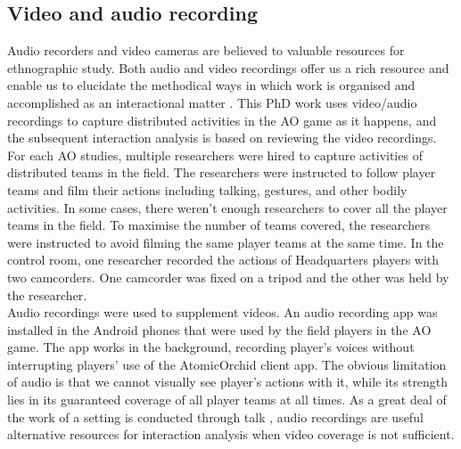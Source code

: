 \subsection{Video and audio recording}
Audio recorders and video cameras are believed to valuable resources for ethnographic study. Both audio and video recordings offer us a rich resource and enable us to elucidate the methodical ways in which work is organised and accomplished as an interactional matter \cite{Crabtree2012}. This PhD work uses video/audio recordings to capture distributed activities in the \acf{AO} game as it happens, and the subsequent interaction analysis is based on reviewing the video recordings. \\

For each \ac{AO} studies, multiple researchers were hired to capture activities of distributed teams in the field. The researchers were instructed to follow player teams and film their actions including talking, gestures, and other bodily activities. In some cases, there weren't enough researchers to cover all the player teams in the field. To maximise the number of teams covered, the researchers were instructed to avoid filming the same player teams at the same time. In the control room, one researcher recorded the actions of Headquarters players with two camcorders. One camcorder was fixed on a tripod and the other was held by the researcher. \\

Audio recordings were used to supplement videos. An audio recording app was installed in the Android phones that were used by the field players in the \ac{AO} game. The app works in the background, recording player's voices without interrupting players' use of the AtomicOrchid client app. The obvious limitation of audio is that we cannot visually see player's actions with it, while its strength lies in its guaranteed coverage of all player teams at all times. As a great deal of the work of a setting is conducted through talk \cite{Crabtree2012}, audio recordings are useful alternative resources for interaction analysis when video coverage is not sufficient. \\


